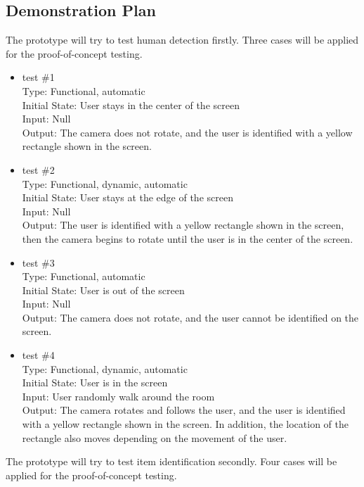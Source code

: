 \documentclass[12pt, titlepage]{article}
\begin{document}
\subsection{Demonstration Plan}
The prototype will try to test human detection firstly. Three cases will be applied for the proof-of-concept testing.
\begin{itemize}
\item{test \#1\\}
Type: Functional, automatic\\
Initial State: User stays in the center of the screen\\
Input: Null\\
Output: The camera does not rotate, and the user is identified with a yellow rectangle shown in the screen.\\			
\item{test \#2\\}
Type: Functional, dynamic, automatic\\
Initial State: User stays at the edge of the screen\\
Input: Null\\
Output: The user is identified with a yellow rectangle shown in the screen, then the camera begins to rotate until the user is in the center of the screen.\\
\item{test \#3\\}
Type: Functional, automatic\\
Initial State: User is out of the screen\\
Input: Null\\
Output: The camera does not rotate, and the user cannot be identified on the screen.\\
\item{test \#4\\}
Type: Functional, dynamic, automatic\\
Initial State: User is in the screen\\
Input: User randomly walk around the room\\
Output: The camera rotates and follows the user, and the user is identified with a yellow rectangle shown in the screen. In addition, the location of the rectangle also moves depending on the movement of the user.\\
\end{itemize}
The prototype will try to test item identification secondly. Four cases will be applied for the proof-of-concept testing.
\end{document}
